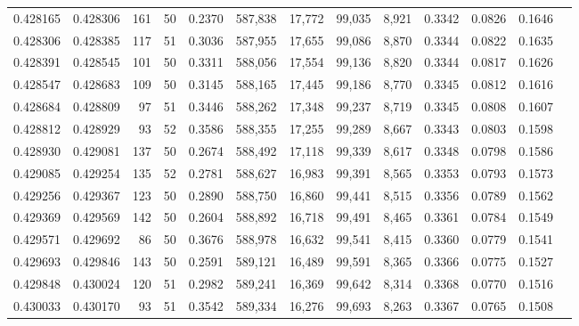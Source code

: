 \begin{tabular}{rrrrrrrrrrrrr}
0.428165 & 0.428306 &   161 &  50 &                                     0.2370 & 587,838 &  17,772 &  99,035 &   8,921 & 0.3342 & 0.0826 & 0.1646 \\
0.428306 & 0.428385 &   117 &  51 &                                     0.3036 & 587,955 &  17,655 &  99,086 &   8,870 & 0.3344 & 0.0822 & 0.1635 \\
0.428391 & 0.428545 &   101 &  50 &                                     0.3311 & 588,056 &  17,554 &  99,136 &   8,820 & 0.3344 & 0.0817 & 0.1626 \\
0.428547 & 0.428683 &   109 &  50 &                                     0.3145 & 588,165 &  17,445 &  99,186 &   8,770 & 0.3345 & 0.0812 & 0.1616 \\
0.428684 & 0.428809 &    97 &  51 &                                     0.3446 & 588,262 &  17,348 &  99,237 &   8,719 & 0.3345 & 0.0808 & 0.1607 \\
0.428812 & 0.428929 &    93 &  52 &                                     0.3586 & 588,355 &  17,255 &  99,289 &   8,667 & 0.3343 & 0.0803 & 0.1598 \\
0.428930 & 0.429081 &   137 &  50 &                                     0.2674 & 588,492 &  17,118 &  99,339 &   8,617 & 0.3348 & 0.0798 & 0.1586 \\
0.429085 & 0.429254 &   135 &  52 &                                     0.2781 & 588,627 &  16,983 &  99,391 &   8,565 & 0.3353 & 0.0793 & 0.1573 \\
0.429256 & 0.429367 &   123 &  50 &                                     0.2890 & 588,750 &  16,860 &  99,441 &   8,515 & 0.3356 & 0.0789 & 0.1562 \\
0.429369 & 0.429569 &   142 &  50 &                                     0.2604 & 588,892 &  16,718 &  99,491 &   8,465 & 0.3361 & 0.0784 & 0.1549 \\
0.429571 & 0.429692 &    86 &  50 &                                     0.3676 & 588,978 &  16,632 &  99,541 &   8,415 & 0.3360 & 0.0779 & 0.1541 \\
0.429693 & 0.429846 &   143 &  50 &                                     0.2591 & 589,121 &  16,489 &  99,591 &   8,365 & 0.3366 & 0.0775 & 0.1527 \\
0.429848 & 0.430024 &   120 &  51 &                                     0.2982 & 589,241 &  16,369 &  99,642 &   8,314 & 0.3368 & 0.0770 & 0.1516 \\
0.430033 & 0.430170 &    93 &  51 &                                     0.3542 & 589,334 &  16,276 &  99,693 &   8,263 & 0.3367 & 0.0765 & 0.1508 \\

\end{tabular}

